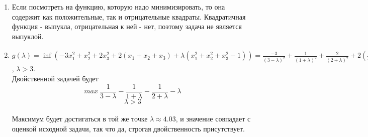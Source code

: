 \documentclass[12pt]{extreport}
\theoremstyle{definiton}
\theoremstyle{definition}
\theoremstyle{definition}
\begin{document}
\begin{enumerate}
\begin{enumerate}
        \\ Условия ККТ: 
        \begin{enumerate}
            \item $L_{x_1}^{'} = -6x_1+2+2\lambda x_1 = 0 \to x_1 = 1/(3-\lambda)$
            \item $L_{x_2}^{'} = 2x_2+2+2\lambda x_2 = 0 \to x_2 = -1/(1+\lambda)$
            \item $L_{x_3}^{'} = 4x_3+2+2\lambda x_3 = 0 \to x_3 = -1/(2+\lambda)$
            \item $x_1^2+x_2^2+x_3^2 = 1$
        \end{enumerate}
        \\ Выразив $x_1,x_2,x_3$ через $\lambda$, подставим их в условие и получим уравнение. Решив систему, мы получим несколько точек: $\lambda_1 \approx -3,15$, $\lambda_2 \approx 0.22$, $\lambda_3 \approx 1.89$, $\lambda_4 \approx 4.03$.
        \\ Но чтобы точка действительно была минимумом, необходимо, чтобы гессиан в этой точке был положительно определен. В нашем случае, гессиан будет диагональной матрицей, с элементами $-6+2\lambda$, $2+2\lambda$, $4+2\lambda$ на диагонали. Чтобы матрица была положительно опрееделенной, нам по критреию сильвестра, надо потребовать чтобы главные миноры были положительны, что эквивалентно в нашем случае положительности вторых производных. Таким образом, $\lambda > 3$, значит нам подходит одна точка с $\lambda \approx 4.03$.
        \\ $x_1 \approx -0.97$, $x_2 \approx -0.199$, $x_3 \approx 0.166$. Минимум будет равен $\approx -5.4$
        \item Если посмотреть на функцию, которую надо минимизировать, то она содержит как положительные, так и отрицательные квадраты. Квадратичная функция - выпукла, отрицательная к ней - нет, поэтому задача не является выпуклой.
        \item $g(\lambda) = \inf (-3x_1^2+x_2^2+2x_3^2+2(x_1+x_2+x_3)+\lambda(x_1^2+x_2^2+x_3^2-1)) = \frac{-3}{(3-\lambda)^2} + \frac{1}{(1+\lambda)^2} + \frac{2}{(2+\lambda)^2}+2(\frac{1}{3-\lambda} - \frac{1}{1+\lambda} - \frac{1}{2+\lambda})+\lambda(\frac{1}{(3-\lambda)^2} + \frac{1}{(1+\lambda)^2} + \frac{1}{(2+\lambda)^2}) -\lambda = \frac{1}{3-\lambda}-\frac{1}{1+\lambda}-\frac{1}{2+\lambda}-\lambda$, $\lambda > 3$.
        \\ Двойственной задачей будет $$max\ \frac{1}{3-\lambda}-\frac{1}{1+\lambda}-\frac{1}{2+\lambda}-\lambda$$ $$\lambda > 3$$
        \\ Максимум будет достигаться в той же точке $\lambda \approx 4.03$, и значение совпадает с оценкой исходной задачи, так что да, строгая двойственность присутствует.

\end{enumerate}
\end{enumerate}
\end{document}
